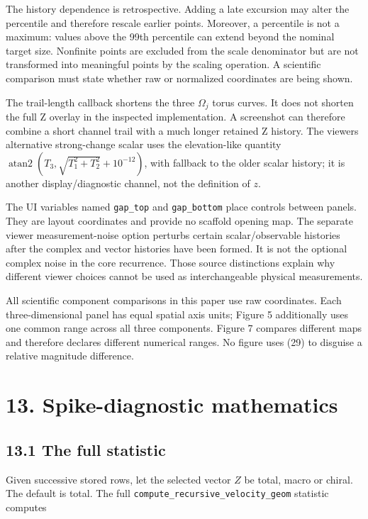 \documentclass[
  11pt,
  a4paper,
]{article}
\begin{document}
The history dependence is retrospective. Adding a late excursion may alter the percentile and therefore rescale earlier points. Moreover, a percentile is not a maximum: values above the 99th percentile can extend beyond the nominal target size. Nonfinite points are excluded from the scale denominator but are not transformed into meaningful points by the scaling operation. A scientific comparison must state whether raw or normalized coordinates are being shown.

The trail-length callback shortens the three \(\Omega_j\) torus curves. It does not shorten the full Z overlay in the inspected implementation. A screenshot can therefore combine a short channel trail with a much longer retained Z history. The viewer\textquotesingle s alternative strong-change scalar uses the elevation-like quantity \(\operatorname{atan2}(T_3,\sqrt{T_1^2+T_2^2}+10^{-12})\), with fallback to the older scalar history; it is another display/diagnostic channel, not the definition of \(z\).

The UI variables named \texttt{gap\_top} and \texttt{gap\_bottom} place controls between panels. They are layout coordinates and provide no scaffold opening map. The separate viewer measurement-noise option perturbs certain scalar/observable histories after the complex and vector histories have been formed. It is not the optional complex noise in the core recurrence. Those source distinctions explain why different viewer choices cannot be used as interchangeable physical measurements.

All scientific component comparisons in this paper use raw coordinates. Each three-dimensional panel has equal spatial axis units; Figure 5 additionally uses one common range across all three components. Figure 7 compares different maps and therefore declares different numerical ranges. No figure uses (29) to disguise a relative magnitude difference.

\section{13. Spike-diagnostic mathematics}\label{spike-diagnostic-mathematics}

\subsection{13.1 The full statistic}\label{the-full-statistic}

Given successive stored rows, let the selected vector \(Z\) be total, macro or chiral. The default is total. The full \texttt{compute\_recursive\_velocity\_geom} statistic computes
\end{document}

